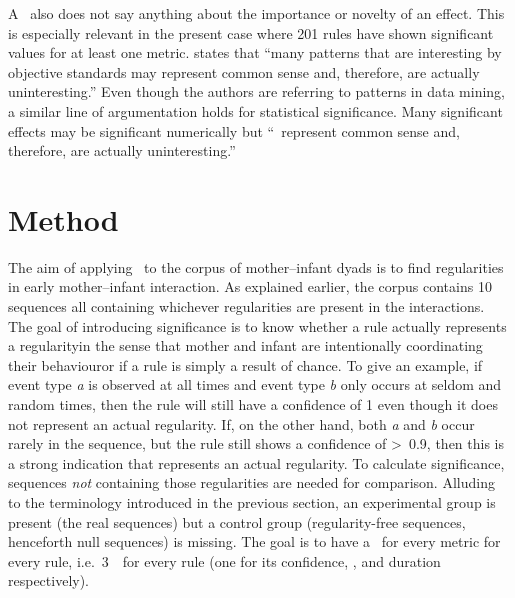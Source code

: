 A \pv\ also does not say anything about the importance or novelty of an effect.
This is especially relevant in the present case where 201 rules have shown significant values for at least one metric.
\citet[]{han_data_2012} states that ``many patterns that are interesting by objective standards may represent common sense and, therefore, are actually uninteresting.''
Even though the authors are referring to patterns in data mining, a similar line of argumentation holds for statistical significance.
Many significant effects may be significant numerically but ``\citeellipses\ represent common sense and, therefore, are actually uninteresting.''




\section{Method}
\label{sec:sigmet}
The aim of applying \fpmlower\ to the corpus of mother--infant dyads is to find regularities in early mother--infant interaction.
As explained earlier, the corpus contains 10 sequences all containing whichever regularities are present in the interactions.
The goal of introducing significance is to know whether a rule actually represents a regularity\dash in the sense that mother and infant are intentionally coordinating their behaviour\dash or if a rule is simply a result of chance.
To give an example, if event type \emph{a} is observed at all times and event type \emph{b} only occurs at seldom and random times, then the rule  will still have a confidence of 1 even though it does not represent an actual regularity.
If, on the other hand, both \emph{a} and \emph{b} occur rarely in the sequence, but the rule still shows a confidence of >~0.9, then this is a strong indication that  represents an actual regularity.
To calculate significance, sequences \emph{not} containing those regularities are needed for comparison.
Alluding to the terminology introduced in the previous section, an experimental group is present (the real sequences) but a control group (regularity-free sequences, henceforth null sequences) is missing.
The goal is to have a \pv\ for every metric for every rule, i.e.~3~\pv\ for every rule (one for its confidence, \noc, and duration respectively).%

